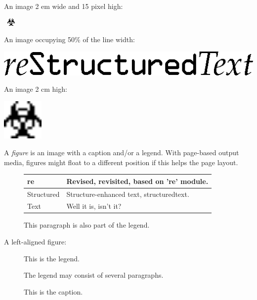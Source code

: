 \documentclass[a4paper]{article}
\newlength{\DUtablewidth} %
\newenvironment{DUlegend}{\small}{}
\begin{document}
An image 2 em wide and 15 pixel high:

\includegraphics[height=15px,width=2em]{../../../docs/user/rst/images/biohazard.png}

An image occupying 50\% of the line width:

\includegraphics[width=0.500\linewidth]{../../../docs/user/rst/images/title.png}

An image 2 cm high:

\includegraphics[height=2cm]{../../../docs/user/rst/images/biohazard.png}

A \emph{figure} is an image with a caption and/or a legend.  With page-based output
media, figures might float to a different position if this helps the page
layout.
\begin{figure}
\noindent{}
\caption{Plaintext markup syntax and parser system.}
\begin{DUlegend}
\leavevmode
\setlength{\DUtablewidth}{\linewidth}
\begin{longtable}[c]{|p{0.156\DUtablewidth}|p{0.563\DUtablewidth}|}
\hline

re
 & 
Revised, revisited, based on 're' module.
 \\
\hline

Structured
 & 
Structure-enhanced text, structuredtext.
 \\
\hline

Text
 & 
Well it is, isn't it?
 \\
\hline
\end{longtable}

This paragraph is also part of the legend.
\end{DUlegend}
\end{figure}

A left-aligned figure:
\begin{figure}
\noindent{}
\caption{This is the caption.}
\begin{DUlegend}
This is the legend.

The legend may consist of several paragraphs.
\end{DUlegend}
\end{figure}
\end{document}
